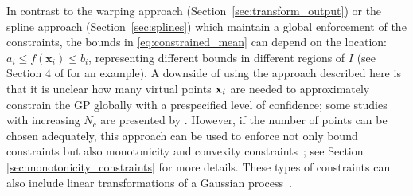 In contrast to the warping approach (Section~\ref{sec:transform_output}) or the spline approach (Section~\ref{sec:splines}) which maintain a global enforcement of the constraints, the bounds in \eqref{eq:constrained_mean} can depend on the location: $a_i \le f(\mathbf{x}_i) \le b_i$, representing different bounds in different regions of $I$ (see Section 4 of  for an example).
A downside of using the approach described here is that it is unclear how many virtual points $\bold{x}_i$ are needed to approximately constrain the GP globally with a prespecified level of confidence; some studies with increasing $N_c$ are presented by . However, if the number of points can be chosen adequately, this approach can be used to enforce not only bound constraints but also monotonicity and convexity constraints~; see Section \ref{sec:monotonicity_constraints} for more details. These types of constraints can also include linear transformations of a Gaussian process~. 
